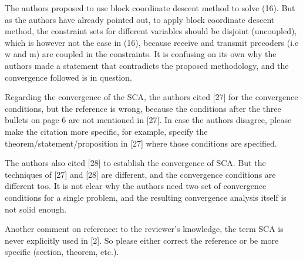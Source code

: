 \begin{enumerate}
 The authors proposed to use block coordinate descent method to solve (16). But as the authors have already pointed out, to apply block coordinate descent method, the constraint sets for different variables should be disjoint (uncoupled), which is however not the case in (16), because receive and transmit precoders (i.e w and m) are coupled in the constraints. It is confusing on its own why the authors made a statement that contradicts the proposed methodology, and the convergence followed is in question.

\resp {}

 Regarding the convergence of the SCA, the authors cited [27] for the convergence conditions, but the reference is wrong, because the conditions after the three bullets on page 6 are not mentioned in [27]. In case the authors disagree, please make the citation more specific, for example, specify the theorem/statement/proposition in [27] where those conditions are specified.

\resp {}

 The authors also cited [28] to establish the convergence of SCA. But the techniques of [27] and [28] are different, and the convergence conditions are different too. It is not clear why the authors need two set of convergence conditions for a single problem, and the resulting convergence analysis itself is not solid enough.

\resp {}

 Another comment on reference: to the reviewer's knowledge, the term SCA is never explicitly used in [2]. So please either correct the reference or be more specific (section, theorem, etc.).


\end{enumerate}
